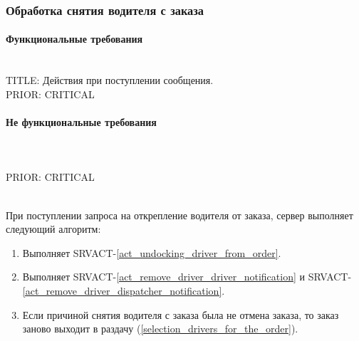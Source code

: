   \subsubsection{Обработка снятия водителя с заказа} \label{remove_driver_from_order}

    \paragraph{Функциональные требования} \mbox{}\\

      TITLE: Действия при поступлении сообщения.
     	\\
      PRIOR: CRITICAL\\

    \paragraph{Не функциональные требования} \mbox{}\\

      \\
      PRIOR: CRITICAL\\


    	\begin{alg}  \label{remove_driver_from_order_alg} \mbox{}\\

        При поступлении запроса на открепление водителя от заказа, сервер выполняет следующий алгоритм:

        \begin{enumerate}
          \item Выполняет SRVACT-\ref{act_undocking_driver_from_order}.
          \item Выполняет SRVACT-\ref{act_remove_driver_driver_notification} и SRVACT-\ref{act_remove_driver_dispatcher_notification}.
          \item Если причиной снятия водителя с заказа была не отмена заказа, то заказ заново выходит в раздачу (\ref{selection_drivers_for_the_order}).
        \end{enumerate}
      \end{alg}

